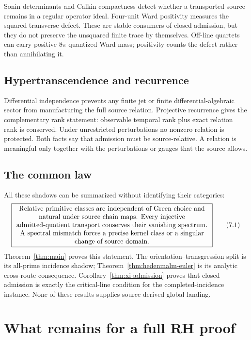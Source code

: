 \documentclass[11pt]{article}
\theoremstyle{definition}
\theoremstyle{remark}
\begin{document}
Sonin determinants and Calkin compactness detect whether a transported
source remains in a regular operator ideal.  Four-unit Ward positivity
measures the squared transverse defect.  These are stable consumers of
closed admission, but they do not preserve the unsquared finite trace by
themselves.  Off-line quartets can carry positive \(8\pi\)-quantized Ward
mass; positivity counts the defect rather than annihilating it.

\subsection{Hypertranscendence and recurrence}

Differential independence prevents any finite jet or finite
differential-algebraic sector from manufacturing the full source
relation.  Projective recurrence gives the complementary rank statement:
observable temporal rank plus exact relation rank is conserved.  Under
unrestricted perturbations no nonzero relation is protected.  Both facts
say that admission must be source-relative.  A relation is meaningful
only together with the perturbations or gauges that the source allows.

\subsection{The common law}

All these shadows can be summarized without identifying their categories:
\[
\boxed{
\begin{minipage}{0.84\linewidth}
\centering
Relative primitive classes are independent of Green choice and natural
under source chain maps.  Every injective admitted-quotient transport
conserves their vanishing spectrum.  A spectral mismatch forces a precise
kernel class or a singular change of source domain.
\end{minipage}}
\tag{7.1}\label{eq:universal-law}
\]
Theorem~\ref{thm:main} proves this statement.  The
orientation--transgression split is its all-prime incidence shadow;
Theorem~\ref{thm:hedenmalm-euler} is its analytic cross-route
consequence.  Corollary~\ref{thm:xi-admission} proves that closed admission
is exactly the critical-line condition for the completed-incidence
instance.  None of these results supplies source-derived global landing.

\section{What remains for a full RH proof}
\label{sec:proof}
\end{document}
